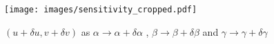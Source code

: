 \documentclass[12pt]{article}
\begin{document}
\begin{figure}
\centering
\texttt{[image: images/sensitivity\_cropped.pdf]}
\caption{$(u + \delta u,v + \delta v)$ as $\alpha \rightarrow \alpha + \delta\alpha$ , $\beta \rightarrow \beta + \delta\beta$ and $\gamma \rightarrow \gamma + \delta\gamma$}\label{fig:sensitivity}
\end{figure}

%
%
%
%
%
\end{document}
